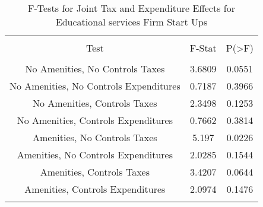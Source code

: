 
\begin{table}[!htbp] \centering 
  \caption{F-Tests for Joint Tax and Expenditure Effects for Educational services Firm Start Ups} 
  \label{61Ftests} 
\begin{tabular}{@{\extracolsep{5pt}} ccc} 
\\[-1.8ex]\hline 
\hline \\[-1.8ex] 
Test & F-Stat & P(\textgreater F) \\ 
\hline \\[-1.8ex] 
No Amenities, No Controls Taxes & 3.6809 & 0.0551 \\ 
No Amenities, No Controls Expenditures & 0.7187 & 0.3966 \\ 
No Amenities, Controls Taxes & 2.3498 & 0.1253 \\ 
No Amenities, Controls Expenditures & 0.7662 & 0.3814 \\ 
Amenities, No Controls Taxes & 5.197 & 0.0226 \\ 
Amenities, No Controls Expenditures & 2.0285 & 0.1544 \\ 
Amenities, Controls Taxes & 3.4207 & 0.0644 \\ 
Amenities, Controls Expenditures & 2.0974 & 0.1476 \\ 
\hline \\[-1.8ex] 
\end{tabular} 
\end{table} 
